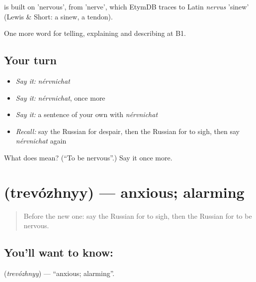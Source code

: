 \begin{cousinweb}
\emph{} is built on \emph{} 'nervous', from \emph{} 'nerve', which EtymDB traces to Latin \emph{nervus} 'sinew' (Lewis \& Short: a sinew, a tendon).
\end{cousinweb}

\begin{grammarlens}[title={What you've built}]
One more word for telling, explaining and describing at B1.
\end{grammarlens}

\subsection*{Your turn}
\begin{itemize}
\raggedright
  \item \emph{Say it:} \emph{nérvnichat}
  \item \emph{Say it:} \emph{nérvnichat}, once more
  \item \emph{Say it:} a sentence of your own with \emph{nérvnichat}
  \item \emph{Recall:} say the Russian for despair, then the Russian for to sigh, then say \emph{nérvnichat} again
\end{itemize}

\begin{tcolorbox}[breakable,colback=teal!4,colframe=teal!35!black,title={Before you move on}]
What does  mean? (\textquotedblleft{}To be nervous\textquotedblright{}.) Say it once more.
\end{tcolorbox}
\section[\texorpdfstring{\ru{тревожный} (trevózhnyy)}{тревожный (trevózhnyy)}]{ (trevózhnyy) — anxious; alarming}

\label{lesson:RU-C474-trevozhnyy}



\begin{quote}
Before the new one: say the Russian for to sigh, then the Russian for to be nervous.
\end{quote}

\subsection*{You'll want to know: }
\textbf{} (\emph{trevózhnyy}) — \textquotedblleft{}anxious; alarming\textquotedblright{}.

